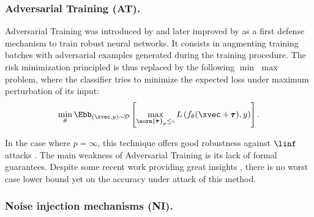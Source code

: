 \subsubsection{Adversarial Training (AT).}
\label{subsubsection:ch6:adversarial_training}

Adversarial Training was introduced by \citep{goodfellow2014explaining} and later improved by \citep{madry2018towards} as a first defense mechanism to train robust neural networks.
It consists in augmenting training batches with adversarial examples generated during the training procedure.
The risk minimization principled is thus replaced by the following $\min$ $\max$ problem, where the classifier tries to minimize the expected loss under maximum perturbation of its input:
\begin{equation}
  \min_{\theta} \Ebb_{(\xvec, y) \sim \mathcal{D}} \left[ \max_{\norm{\pmb{\tau}}_p \leq \epsilon} L \left( f_{\theta}(\xvec + \pmb{\tau}), y \right) \right].
\end{equation}

In the case where $p=\infty$, this technique offers good robustness against $\linf$ attacks \cite{athalye2018obfuscated}.
The main weakness of Adversarial Training is its lack of formal guarantees.
Despite some recent work providing great insights \cite{sinha2017certifying,zhang2019theoretically}, there is no worst case lower bound yet on the accuracy under attack of this method.

\subsubsection{Noise injection mechanisms (NI).}
\label{subsection:ch6-randomized_training}

